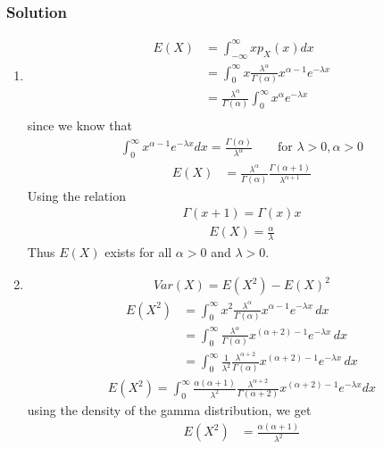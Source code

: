 \documentclass{beamer}
\begin{document}
\begin{frame}[allowframebreaks]
\frametitle{Solution}
\begin{enumerate}
\item
{
\begin{align}
E(X)&= \int_{-\infty}^{\infty} xp_X(x)dx\\
&= \int_{0}^{\infty} x\frac{\lambda^{\alpha}}{\Gamma(\alpha)}x^{\alpha - 1} e^{-\lambda x}\\
&= \frac{\lambda^{\alpha}}{\Gamma(\alpha)} \int_{0}^{\infty}x^{\alpha} e^{-\lambda x}\\
\end{align}
since we know that 
\begin{align}
\int_0^\infty x^{\alpha - 1} e^{-\lambda x} dx = \frac{\Gamma(\alpha)}{\lambda^{\alpha}} \qquad \textrm{for } \lambda > 0, \alpha>0
\end{align}
\begin{align}
E(X)&= \frac{\lambda^{\alpha}}{\Gamma(\alpha)}\frac{\Gamma(\alpha+1)}{\lambda^{\alpha+1}}
\end{align}
Using the relation
\begin{align}
\Gamma(x+1) = \Gamma(x) x
\end{align}
\begin{align}
E(X)=\frac{\alpha}{\lambda}
\end{align}
Thus $E(X)$ exists for all $\alpha > 0 $ and $ \lambda > 0$.
}
\item{
\begin{align}
{Var}(X) = {E}(X^2) - {E}(X)^2 
\end{align}
\begin{align}
{E}(X^2) &= \int_{0}^{\infty} x^2 \frac{{\lambda}^{\alpha}}{\Gamma({\alpha})} x^{{\alpha}-1} e^{-{\lambda}x} \, {d}x \\
&=\int_{0}^{\infty} \frac{{\lambda}^{\alpha}}{\Gamma({\alpha})} x^{({\alpha}+2)-1} e^{-{\lambda}x} \, {d}x \\
&=\int_{0}^{\infty} \frac{1}{{\lambda}^2} \frac{{\lambda}^{{\alpha}+2}}{\Gamma({\alpha})} x^{({\alpha}+2)-1} e^{-{\lambda}x} \, {d}x 
\end{align}
\begin{align}
{E}(X^2) = \int_{0}^{\infty} \frac{{\alpha}({\alpha}+1)}{{\lambda}^2}  \frac{{\lambda}^{{\alpha}+2}}{\Gamma({\alpha}+2)} x^{({\alpha}+2)-1} e^{-{\lambda}x}{d}x
\end{align}
using the density of the gamma distribution, we get
\begin{align}
{E}(X^2) &= \frac{{\alpha}({\alpha}+1)}{{\lambda}^2} 

\end{align}}
\end{enumerate}
\end{frame}
\end{document}
